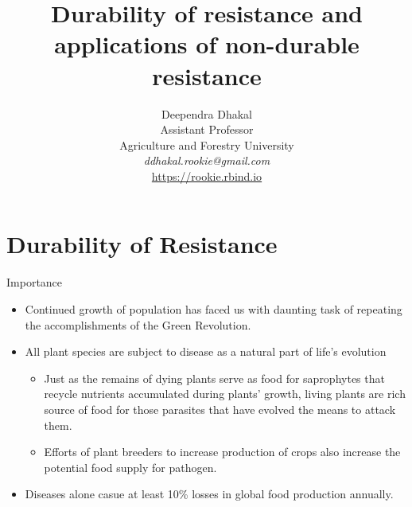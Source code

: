 \documentclass[11pt,dvipsnames,ignorenonframetext,aspectratio=169]{beamer}
\title[]{Durability of resistance and applications of non-durable
resistance}
\author[
        \vspace{-0.5cm}Deependra Dhakal\\
Assistant Professor\\
Agriculture and Forestry University\\
\textit{ddhakal.rookie@gmail.com}\\
\url{https://rookie.rbind.io}
    ]{\vspace{-0.5cm}Deependra Dhakal\\
Assistant Professor\\
Agriculture and Forestry University\\
\textit{ddhakal.rookie@gmail.com}\\
\url{https://rookie.rbind.io}}
\date[
      
  ]{
    }
\providecommand{\tightlist}{%
  \setlength{\itemsep}{0pt}\setlength{\parskip}{0pt}}
\begin{document}
  \begin{frame}[plain]
  \titlepage
  \end{frame}



\hypertarget{durability-of-resistance}{%
\section{Durability of Resistance}\label{durability-of-resistance}}

\begin{frame}{Importance}
\protect\hypertarget{importance}{}
\begin{itemize}
\tightlist
\item
  Continued growth of population has faced us with daunting task of
  repeating the accomplishments of the Green Revolution.
\item
  All plant species are subject to disease as a natural part of life's
  evolution

  \begin{itemize}
  \tightlist
  \item
    Just as the remains of dying plants serve as food for saprophytes
    that recycle nutrients accumulated during plants' growth, living
    plants are rich source of food for those parasites that have evolved
    the means to attack them.
  \item
    Efforts of plant breeders to increase production of crops also
    increase the potential food supply for pathogen.
  \end{itemize}
\item
  Diseases alone casue at least 10\% losses in global food production
  annually.
\end{itemize}
\end{frame}
\end{document}
